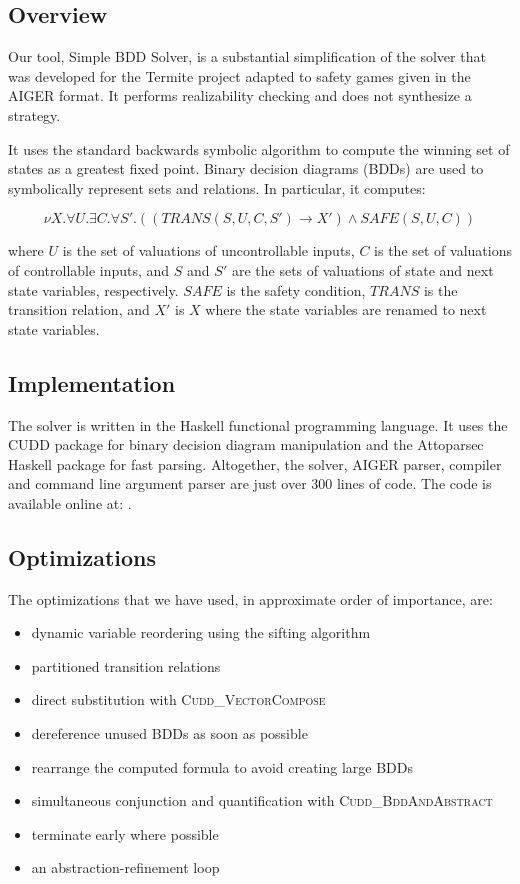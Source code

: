 \subsection{Overview}
Our tool, Simple BDD Solver, is a substantial simplification of the solver that was developed for the Termite project adapted to safety games given in the AIGER format. 
It performs realizability checking and does not synthesize a strategy.

It uses the standard backwards symbolic algorithm to compute the winning set of states as a greatest fixed point. Binary decision diagrams (BDDs) are used to symbolically represent sets and relations. In particular, it computes:

\begin{equation}
\label{eqn:mu}
\nu X. \forall U. \exists C. \forall S'. ((TRANS(S, U, C, S') \rightarrow X') \wedge SAFE(S, U, C))
\end{equation}

\noindent where $U$ is the set of valuations of uncontrollable inputs, $C$ is the set of valuations of controllable inputs, and $S$ and $S'$ are the sets of valuations of state and next state variables, respectively. $SAFE$ is the safety condition, $TRANS$ is the transition relation, and $X'$ is $X$ where the state variables are renamed to next state variables.

\subsection{Implementation}
The solver is written in the Haskell functional programming language. It uses the CUDD \cite{cudd} package for binary decision diagram manipulation and the Attoparsec \cite{attoparsec} Haskell package for fast parsing. Altogether, the solver, AIGER parser, compiler and command line argument parser are just over 300 lines of code. The code is available online at: .

\subsection{Optimizations}

The optimizations that we have used, in approximate order of importance, are:
\begin{itemize}
    \item dynamic variable reordering using the sifting algorithm \cite{sifting}
    \item partitioned transition relations \cite{partitioned}
    \item direct substitution with \textsc{Cudd\_VectorCompose}
    \item dereference unused BDDs as soon as possible
    \item rearrange the computed formula to avoid creating large BDDs
    \item simultaneous conjunction and quantification with \textsc{Cudd\_BddAndAbstract}
    \item terminate early where possible
    \item an abstraction-refinement loop
\end{itemize}

